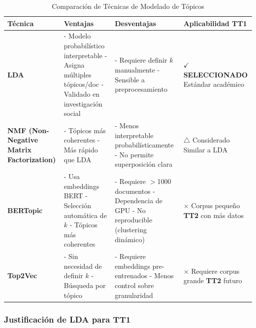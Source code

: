 \begin{table}[h]
\centering
\caption{Comparación de Técnicas de Modelado de Tópicos}
\label{tab:topicos_comparacion}
\begin{tabular}{|p{2.5cm}|p{4.5cm}|p{4cm}|p{3cm}|}
\hline
\textbf{Técnica} & \textbf{Ventajas} & \textbf{Desventajas} & \textbf{Aplicabilidad TT1} \\
\hline
\textbf{LDA} & 
- Modelo probabilístico interpretable \newline
- Asigna múltiples tópicos/doc \newline
- Validado en investigación social & 
- Requiere definir $k$ manualmente \newline
- Sensible a preprocesamiento & 
\textbf{$\checkmark$ SELECCIONADO} \newline
Estándar académico \\
\hline
\textbf{NMF (Non-Negative Matrix Factorization)} & 
- Tópicos más coherentes \newline
- Más rápido que LDA & 
- Menos interpretable probabilísticamente \newline
- No permite superposición clara & 
$\triangle$ Considerado \newline
Similar a LDA \\
\hline
\textbf{BERTopic} & 
- Usa embeddings BERT \newline
- Selección automática de $k$ \newline
- Tópicos más coherentes & 
- Requiere $>$1000 documentos \newline
- Dependencia de GPU \newline
- No reproducible (clustering dinámico) & 
$\times$ Corpus pequeño \newline
\textbf{TT2} con más datos \\
\hline
\textbf{Top2Vec} & 
- Sin necesidad de definir $k$ \newline
- Búsqueda por tópico & 
- Requiere embeddings pre-entrenados \newline
- Menos control sobre granularidad & 
$\times$ Requiere corpus grande \newline
\textbf{TT2} futuro \\
\hline
\end{tabular}
\end{table}

\subsubsection{Justificación de LDA para TT1}
\label{subsubsec:justificacion_lda}


